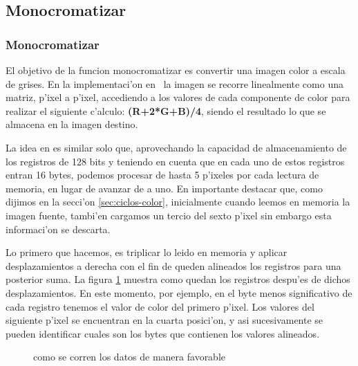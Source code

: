 \subsection{Monocromatizar}
\subsubsection{Monocromatizar  }
El objetivo de la funcion monocromatizar es convertir una imagen color a escala de grises. En la implementaci'on en 
\C\ la imagen se recorre linealmente como una matriz, p'ixel a p'ixel, accediendo a los valores de cada componente de color para realizar el siguiente c'alculo: \textbf{(R+2*G+B)/4}, siendo el resultado lo que se almacena en la imagen destino.

La idea en \ass es similar solo que, aprovechando la capacidad de almacenamiento de los registros de 128 bits
y teniendo en cuenta que en cada uno de estos registros entran 16 bytes, podemos procesar de hasta 5 p'ixeles
por cada lectura de memoria, en lugar de avanzar de a uno. En importante destacar que, como dijimos en la secci'on \ref{sec:ciclos-color}, inicialmente cuando leemos en memoria la imagen fuente, tambi'en cargamos un tercio del sexto p'ixel sin embargo esta informaci'on se descarta.

Lo primero que hacemos, es triplicar lo leido en memoria y aplicar desplazamientos a derecha con el fin de queden alineados los registros para una posterior suma. La figura \ref{est:m-dos} muestra como quedan los registros despu'es de dichos desplazamientos. En este momento, por ejemplo, en el byte menos significativo de cada registro tenemos el valor de color del primero p'ixel. Los valores del siguiente p'ixel se encuentran en la cuarta posici'on, y asi sucesivamente se pueden identificar cuales son los bytes que contienen los valores alineados.

\begin{figure}[h!]
\caption{como se corren los datos de manera favorable}
\label{est:m-dos}
\end{figure}


